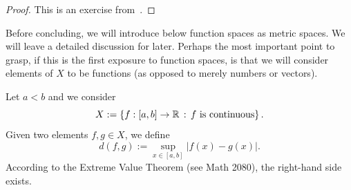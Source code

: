 \begin{proof}
	This is an exercise from~.
\end{proof}
Before concluding, we will introduce below function spaces as metric spaces. We will leave a detailed discussion for later. Perhaps the most important point to grasp, if this is the first exposure to function spaces, is that we will consider elements of $X$ to be functions (as opposed to merely numbers or vectors).
\begin{eg}
	Let $a<b$ and we consider
	\[
	X:= \left\{f:[a,b]\to \mathbb{R}\, : \, f\text{ is continuous}\right\}.
	\]
	Given two elements $f,g\in X$, we define
	\[
	d(f,g):= \sup_{x\in[a,b]}|f(x) - g(x)|.
	\]
	According to the Extreme Value Theorem (see Math 2080), the right-hand side exists.
\end{eg}